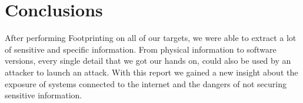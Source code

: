 \section{Conclusions}

After performing Footprinting on all of our targets, we were able to extract a lot of sensitive and specific information. From physical information to software versions, every single detail that we got our hands on, could also be used by an attacker to launch an attack.
With this report we gained a new insight about the exposure of systems connected to the internet and the dangers of not securing sensitive information.

\pagebreak